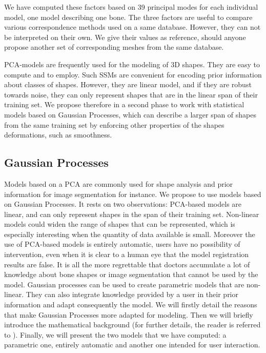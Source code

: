 We have computed these factors based on 39 principal modes for each individual model, one model describing one bone. The three factors are useful to compare various correspondence methods used on a same database. However, they can not be interpreted on their own. We give their values as reference, should anyone propose another set of corresponding meshes from the same database. 

PCA-models are frequently used for the modeling of 3D shapes. They are easy to compute and to employ. Such SSMs are convenient for encoding prior information about classes of shapes. However, they are linear model, and if they are robust towards noise, they can only represent shapes that are in the linear span of their training set. We propose therefore in a second phase to work with statistical models based on Gaussian Processes, which can describe a larger span of shapes from the same training set by enforcing other properties of the shapes deformations, such as smoothness.

\clearpage

\subsection{Gaussian Processes}
\label{subsec:4_GP}

Models based on a PCA are commonly used for shape analysis and prior information for image segmentation for instance. We propose to use models based on Gaussian Processes. It rests on two observations: PCA-based models are linear, and can only represent shapes in the span of their training set. Non-linear models could widen the range of shapes that can be represented, which is especially interesting when the quantity of data available is small. Moreover the use of PCA-based models is entirely automatic, users have no possibility of intervention, even when it is clear to a human eye that the model registration results are false. It is all the more regrettable that doctors accumulate a lot of knowledge about bone shapes or image segmentation that cannot be used by the model. Gaussian processes can be used to create parametric models that are non-linear. They can also integrate knowledge provided by a user in their prior information and adapt consequently the model. 
We will firstly detail the reasons that make Gaussian Processes more adapted for modeling. Then we will briefly introduce the mathematical background (for further details, the reader is referred to 
\cite{luthi_2017_gaussian, duvenaud_2014_automatic, williams_2001_using}). Finally, we will present the two models that we have computed: a parametric one, entirely automatic and another one intended for user interaction. 

